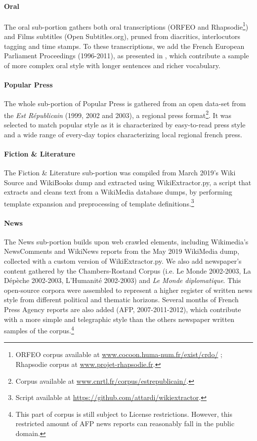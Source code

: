 \paragraph{\Cabernet Oral} \label{subsec:DescribeCaBeRnetOral}
The oral sub-portion gathers both oral transcriptions (\textsc{ORFEO} and Rhapsodie\footnote{\textsc{ORFEO} corpus available at \url{www.cocoon.huma-num.fr/exist/crdo/} ; Rhapsodie corpus at \url{www.projet-rhapsodie.fr}.}) and Films subtitles (Open Subtitles.org), pruned from diacritics, interlocutors tagging and time stamps. To these transcriptions, we add the French European Parliament Proceedings (1996-2011), as presented in \citet{koehn-2005-europarl}, which contribute a sample of more complex oral style with longer sentences and richer vocabulary.

\paragraph{\Cabernet Popular Press} \label{subsec:DescribeCaBeRnetPop}
The whole sub-portion of Popular Press is gathered from an open data-set from the \textit{Est Républicain} (1999, 2002 and 2003), a regional press format\footnote{Corpus available at \url{www.cnrtl.fr/corpus/estrepublicain/}.}. It was selected to match popular style as it is characterized by easy-to-read press style and a wide range of every-day topics characterizing local regional french press.

\paragraph{\Cabernet Fiction \& Literature} \label{subsec:DescribeCaBeRnetFic}
The Fiction \& Literature sub-portion was compiled from March 2019's Wiki Source and WikiBooks dump and extracted using WikiExtractor.py, a script that extracts and cleans text from a WikiMedia database dumps, by performing template expansion and preprocessing of template definitions.\footnote{Script available at \url{https://github.com/attardi/wikiextractor}.}

\paragraph{\Cabernet News} \label{subsec:DescribeCaBeRnetNews}
The News sub-portion builds upon web crawled elements, including Wikimedia's NewsComments and WikiNews reports from the May 2019 WikiMedia dump, collected with a custom version of WikiExtractor.py. We also add newspaper's content gathered by the Chambers-Rostand Corpus (i.e. Le Monde 2002-2003, La Dépèche 2002-2003, L'Humanité 2002-2003) and \emph{Le Monde diplomatique}. This open-source corpora were assembled to represent a higher register of written news style from different political and thematic horizons. Several months of French Press Agency reports are also added (AFP, 2007-2011-2012), which contribute with a more simple and telegraphic style than the others newspaper written samples of the corpus.\footnote{This part of \Cabernet corpus is still subject to License restrictions. However, this restricted amount of AFP news reports can reasonably fall in the public domain.}

